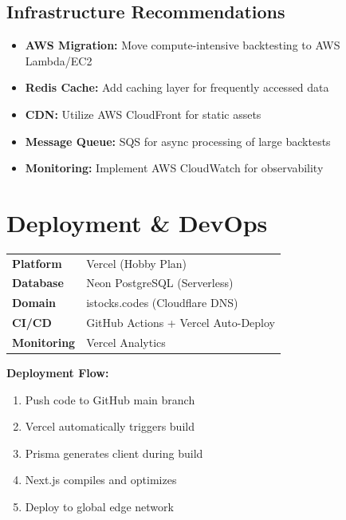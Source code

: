 \documentclass[11pt,a4paper]{article}
\begin{document}
\subsection{Infrastructure Recommendations}

\begin{itemize}[leftmargin=*]
    \item \textbf{AWS Migration:} Move compute-intensive backtesting to AWS Lambda/EC2
    \item \textbf{Redis Cache:} Add caching layer for frequently accessed data
    \item \textbf{CDN:} Utilize AWS CloudFront for static assets
    \item \textbf{Message Queue:} SQS for async processing of large backtests
    \item \textbf{Monitoring:} Implement AWS CloudWatch for observability
\end{itemize}

\section{Deployment \& DevOps}

\begin{techbox}
\begin{tabularx}{\textwidth}{lX}
    \textbf{Platform} & Vercel (Hobby Plan) \\
    \textbf{Database} & Neon PostgreSQL (Serverless) \\
    \textbf{Domain} & istocks.codes (Cloudflare DNS) \\
    \textbf{CI/CD} & GitHub Actions + Vercel Auto-Deploy \\
    \textbf{Monitoring} & Vercel Analytics \\
\end{tabularx}
\end{techbox}

\textbf{Deployment Flow:}
\begin{enumerate}[leftmargin=*]
    \item Push code to GitHub main branch
    \item Vercel automatically triggers build
    \item Prisma generates client during build
    \item Next.js compiles and optimizes
    \item Deploy to global edge network
\end{enumerate}
\end{document}
